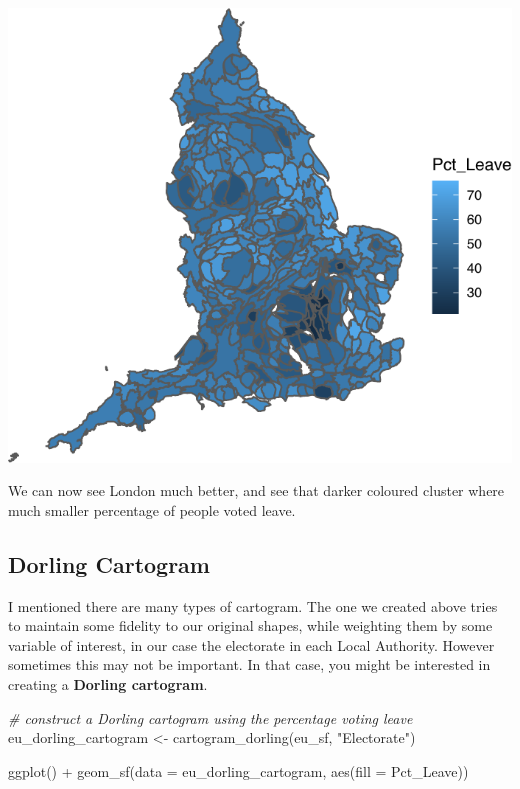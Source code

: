 \documentclass[
]{book}
\newenvironment{Shaded}{\begin{snugshade}}{\end{snugshade}}
\newcommand{\AttributeTok}[1]{\textcolor[rgb]{0.77,0.63,0.00}{#1}}
\newcommand{\CommentTok}[1]{\textcolor[rgb]{0.56,0.35,0.01}{\textit{#1}}}
\newcommand{\FunctionTok}[1]{\textcolor[rgb]{0.00,0.00,0.00}{#1}}
\newcommand{\NormalTok}[1]{#1}
\newcommand{\OtherTok}[1]{\textcolor[rgb]{0.56,0.35,0.01}{#1}}
\newcommand{\SpecialCharTok}[1]{\textcolor[rgb]{0.00,0.00,0.00}{#1}}
\newcommand{\StringTok}[1]{\textcolor[rgb]{0.31,0.60,0.02}{#1}}
\begin{document}
\includegraphics{crime_mapping_files/figure-latex/unnamed-chunk-137-1.pdf}

We can now see London much better, and see that darker coloured cluster where much smaller percentage of people voted leave.

\hypertarget{dorling-cartogram}{%
\subsection{Dorling Cartogram}\label{dorling-cartogram}}

I mentioned there are many types of cartogram. The one we created above tries to maintain some fidelity to our original shapes, while weighting them by some variable of interest, in our case the electorate in each Local Authority. However sometimes this may not be important. In that case, you might be interested in creating a \textbf{Dorling cartogram}.

\begin{Shaded}
\begin{Highlighting}[]
\CommentTok{\# construct a Dorling cartogram using the percentage voting leave}
\NormalTok{eu\_dorling\_cartogram }\OtherTok{\textless{}{-}} \FunctionTok{cartogram\_dorling}\NormalTok{(eu\_sf, }\StringTok{"Electorate"}\NormalTok{)}
\end{Highlighting}
\end{Shaded}

\begin{Shaded}
\begin{Highlighting}[]
\FunctionTok{ggplot}\NormalTok{() }\SpecialCharTok{+}
  \FunctionTok{geom\_sf}\NormalTok{(}\AttributeTok{data =}\NormalTok{ eu\_dorling\_cartogram, }\FunctionTok{aes}\NormalTok{(}\AttributeTok{fill =}\NormalTok{ Pct\_Leave)) }
\end{Highlighting}
\end{Shaded}
\end{document}
